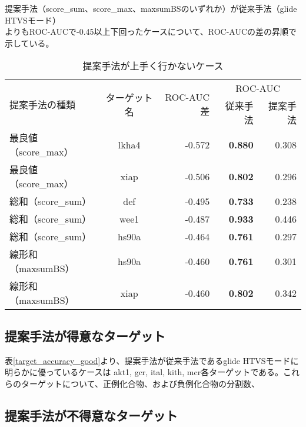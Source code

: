 \begin{table}[htb] \centering
	\caption{提案手法が上手く行かないケース}
	\label{table:target_accuracy_bad}
	提案手法（score\_sum、score\_max、maxsumBSのいずれか）が従来手法（glide HTVSモード）\\
	よりもROC-AUCで-0.45以上下回ったケースについて、ROC-AUCの差の昇順で示している。
	\begin{tabular}{lc|r|rr|}
	\multirow{2}{*}{提案手法の種類}	&\multirow{2}{*}{ターゲット名}	&\multirow{2}{*}{ROC-AUC差}	&\multicolumn{2}{c|}{ROC-AUC}	\\
								&						&							&従来手法	&提案手法		\\ \hline
	最良値（score\_max）			&lkha4					&-0.572						&{\bf 0.880}	&0.308			\\
	最良値（score\_max）			&xiap					&-0.506						&{\bf 0.802}	&0.296			\\
	総和（score\_sum）				&def						&-0.495						&{\bf 0.733}	&0.238			\\
	総和（score\_sum）				&wee1					&-0.487						&{\bf 0.933}	&0.446			\\
	総和（score\_sum）				&hs90a					&-0.464						&{\bf 0.761}	&0.297			\\
	線形和（maxsumBS）			&hs90a					&-0.460						&{\bf 0.761}	&0.301			\\
	線形和（maxsumBS）			&xiap					&-0.460						&{\bf 0.802}	&0.342			\\ \hline
	\end{tabular}
\end{table}

\subsection{提案手法が得意なターゲット}
表\ref{target_accuracy_good}より、提案手法が従来手法であるglide HTVSモードに明らかに優っているケースは
akt1, gcr, ital, kith, mcr各ターゲットである。これらのターゲットについて、正例化合物、および負例化合物の分割数、

\subsection{提案手法が不得意なターゲット}

